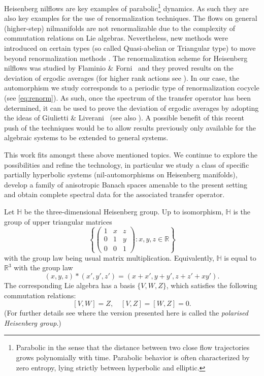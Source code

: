 \documentclass[a4paper,11pt]{amsart}
\theoremstyle{remark}
\newcommand{\bR}{\mathbb{R}} %
\newcommand{\bH}{\mathbb{H}} %
\newcommand{\dv}{V} %
\newcommand{\dw}{W} %
\newcommand{\dz}{Z} %
\begin{document}
Heisenberg nilflows are key examples of parabolic\footnote{Parabolic in the sense that the distance between two close flow trajectories grows polynomially with time. Parabolic behavior is often characterized by zero entropy, lying strictly between hyperbolic and elliptic.} dynamics.
As such they are also key examples for the use of renormalization techniques.
The flows on general (higher-step) nilmanifolds are not renormalizable due to the complexity of commutation relations on Lie algebras. 
Nevertheless, new methods were introduced on certain types (so called Quasi-abelian or Triangular type) to move beyond renormalization methods \cite{Forni16,FF23,Kim22b}.
The renormalization scheme for Heisenberg nilflows was studied by Flaminio \& Forni~\cite{FF06} and they proved results on the deviation of ergodic averages (for higher rank actions see \cite{CF15, Kim22a}).  
In our case, the automorphism we study corresponds to a periodic type of renormalization cocycle (see \eqref{eq:renorm}).
As such, once the spectrum of the transfer operator has been determined, it can be used to prove the deviation of ergodic averages by adopting the ideas of Giulietti \& Liverani~\cite{GL19} (see also \cite{BS20,AB22,Galli24}). 
A possible benefit of this recent push of the techniques would be to allow results previously only available for the algebraic systems to be extended to general systems.

This work fits amongst these above mentioned topics.
We continue to explore the possibilities and refine the technology, in particular we study a class of specific partially hyperbolic systems (nil-automorphisms on Heisenberg manifolds), develop a family of anisotropic Banach spaces amenable to the present setting and obtain complete spectral data for the associated transfer operator. 

Let \(\bH\) be the three-dimensional Heisenberg group.
Up to isomorphism, \(\bH\) is the group of upper triangular matrices
\[
    \left\{
    \left(
    \begin{smallmatrix}
            1 & x & z \\
            0 & 1 & y \\
            0 & 0 & 1
        \end{smallmatrix}
    \right)
    : x,y,z \in \bR
    \right\}
\]
with the group law being usual matrix multiplication.
Equivalently, \(\bH\) is equal to \(\bR^3\) with the group law
\[
    (x,y,z) * (x',y',z') = (x+x', y+y', z+z' + xy').
\]
The corresponding Lie algebra has a basis \(\{\dv,\dw,\dz\}\), which satisfies the following commutation relations:
\begin{equation}
    \label{eq:comm}
    [\dv,\dw]=\dz, \quad [\dv,\dz]=[\dw,\dz]=0.
\end{equation}
(For further details see \cite[Chapter 1]{Folland89} where the version presented here is called the \emph{polarised  Heisenberg group}.)
\end{document}
